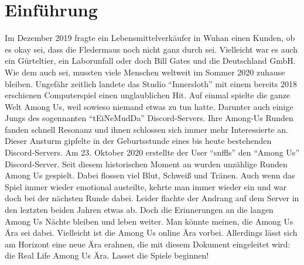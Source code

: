 \section{Einführung}
Im Dezember 2019 fragte ein Lebensmittelverkäufer in Wuhan einen Kunden,
ob es okay sei, dass die Fledermaus noch nicht ganz durch sei. Vielleicht war
es auch ein Gürteltier, ein Laborunfall oder doch Bill Gates und die Deutschland
GmbH. Wie dem auch sei, mussten viele Menschen weltweit im Sommer 2020 zuhause
bleiben. Ungefähr zeitlich landete das Studio ``Innersloth'' mit einem
bereits 2018 erschienen Computerspiel einen unglaublichen Hit. Auf einmal
spielte die ganze Welt Among Us, weil sowieso niemand etwas zu tun hatte.
\newline
Darunter auch einige Jungs des sogennanten ``tEiNeMudDa'' Discord-Servers.
Ihre Among-Us Runden fanden schnell Resonanz und ihnen schlossen sich immer mehr
Interessierte an. Dieser Ansturm gipfelte in der Geburtsstunde eines bis heute
bestehenden Discord-Servers. Am 23. Oktober 2020 erstellte der User
``snffls'' den ``Among Us'' Discord-Server. Seit diesem historischen
Moment an wurden unzählige Runden Among Us gespielt. Dabei flossen viel Blut,
Schweiß und Tränen. Auch wenn das Spiel immer wieder emotional austeilte, kehrte
man immer wieder ein und war doch bei der nächsten Runde dabei.
\newline
Leider flachte der Andrang auf dem Server in den leztzten beiden Jahren etwas
ab. Doch die Erinnerungen an die langen Among Us Nächte bleiben und leben
weiter. Man könnte meinen, die Among Us Ära sei dabei. Vielleicht ist die Among
Us online Ära vorbei. Allerdings lässt sich am Horizont eine neue Ära erahnen,
die mit diesem Dokument eingeleitet wird: die Real Life Among Us Ära. Lasset die
Spiele beginnen!
